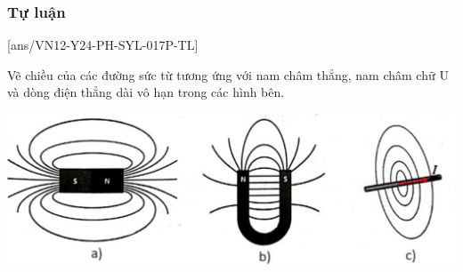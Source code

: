 \subsubsection{Tự luận}
\setcounter{ex}{0}
[ans/VN12-Y24-PH-SYL-017P-TL]
\begin{ex}
	Vẽ chiều của các đường sức từ tương ứng với nam châm thẳng, nam châm chữ U và dòng điện thẳng dài vô hạn trong các hình bên.
	\begin{center}
		\includegraphics[width=0.8\linewidth]{figs/VN12-Y24-PH-SYL-017P-1}
	\end{center}
\end{ex}

